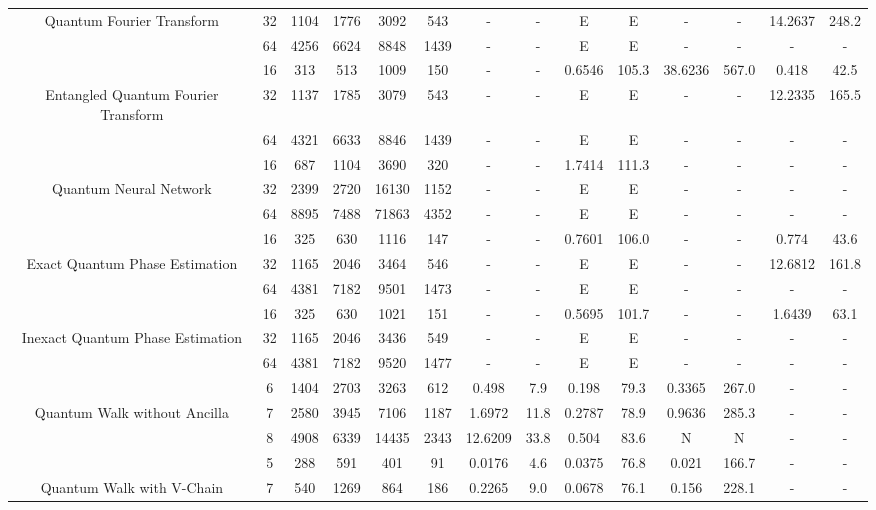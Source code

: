 \begin{table}[htb]
{\begin{tabular}{|c|c|c|c|c|c|c|c|c|c|c|c|c|c|}
Quantum Fourier Transform & 
32 & 1104 & 1776 & 3092 & 543
 & - & -
 & E & E
 & - & -
 & 14.2637 & 248.2
 \\
 & 
64 & 4256 & 6624 & 8848 & 1439
 & - & -
 & E & E
 & - & -
 & - & -
 \\
\hline
 & 
16 & 313 & 513 & 1009 & 150
 & - & -
 & 0.6546 & 105.3
 & 38.6236 & 567.0
 & 0.418 & 42.5
 \\
Entangled Quantum Fourier Transform & 
32 & 1137 & 1785 & 3079 & 543
 & - & -
 & E & E
 & - & -
 & 12.2335 & 165.5
 \\
 & 
64 & 4321 & 6633 & 8846 & 1439
 & - & -
 & E & E
 & - & -
 & - & -
 \\
\hline
 & 
16 & 687 & 1104 & 3690 & 320
 & - & -
 & 1.7414 & 111.3
 & - & -
 & - & -
 \\
Quantum Neural Network & 
32 & 2399 & 2720 & 16130 & 1152
 & - & -
 & E & E
 & - & -
 & - & -
 \\
 & 
64 & 8895 & 7488 & 71863 & 4352
 & - & -
 & E & E
 & - & -
 & - & -
 \\
\hline
 & 
16 & 325 & 630 & 1116 & 147
 & - & -
 & 0.7601 & 106.0
 & - & -
 & 0.774 & 43.6
 \\
Exact Quantum Phase Estimation & 
32 & 1165 & 2046 & 3464 & 546
 & - & -
 & E & E
 & - & -
 & 12.6812 & 161.8
 \\
 & 
64 & 4381 & 7182 & 9501 & 1473
 & - & -
 & E & E
 & - & -
 & - & -
 \\
\hline
 & 
16 & 325 & 630 & 1021 & 151
 & - & -
 & 0.5695 & 101.7
 & - & -
 & 1.6439 & 63.1
 \\
Inexact Quantum Phase Estimation & 
32 & 1165 & 2046 & 3436 & 549
 & - & -
 & E & E
 & - & -
 & - & -
 \\
 & 
64 & 4381 & 7182 & 9520 & 1477
 & - & -
 & E & E
 & - & -
 & - & -
 \\
\hline
 & 
6 & 1404 & 2703 & 3263 & 612
 & 0.498 & 7.9
 & 0.198 & 79.3
 & 0.3365 & 267.0
 & - & -
 \\
Quantum Walk without Ancilla & 
7 & 2580 & 3945 & 7106 & 1187
 & 1.6972 & 11.8
 & 0.2787 & 78.9
 & 0.9636 & 285.3
 & - & -
 \\
 & 
8 & 4908 & 6339 & 14435 & 2343
 & 12.6209 & 33.8
 & 0.504 & 83.6
 & N & N 
 & - & -
 \\
\hline
 & 
5 & 288 & 591 & 401 & 91
 & 0.0176 & 4.6
 & 0.0375 & 76.8
 & 0.021 & 166.7
 & - & -
 \\
Quantum Walk with V-Chain & 
7 & 540 & 1269 & 864 & 186
 & 0.2265 & 9.0
 & 0.0678 & 76.1
 & 0.156 & 228.1
 & - & -
 \\

\end{tabular}}
\end{table}
